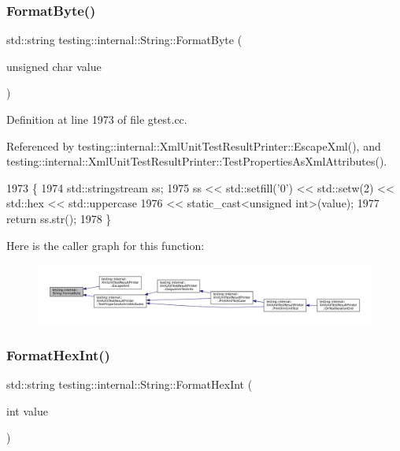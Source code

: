 \subsubsection{\texorpdfstring{Format\+Byte()}{FormatByte()}}
{\footnotesize\ttfamily std\+::string testing\+::internal\+::\+String\+::\+Format\+Byte (\begin{DoxyParamCaption}\item[{unsigned char}]{value }\end{DoxyParamCaption})\hspace{0.3cm}{\ttfamily [static]}}



Definition at line 1973 of file gtest.\+cc.



Referenced by testing\+::internal\+::\+Xml\+Unit\+Test\+Result\+Printer\+::\+Escape\+Xml(), and testing\+::internal\+::\+Xml\+Unit\+Test\+Result\+Printer\+::\+Test\+Properties\+As\+Xml\+Attributes().


\begin{DoxyCode}
1973                                                 \{
1974   std::stringstream ss;
1975   ss << std::setfill(\textcolor{charliteral}{'0'}) << std::setw(2) << std::hex << std::uppercase
1976      << \textcolor{keyword}{static\_cast<}\textcolor{keywordtype}{unsigned} \textcolor{keywordtype}{int}\textcolor{keyword}{>}(value);
1977   \textcolor{keywordflow}{return} ss.str();
1978 \}
\end{DoxyCode}
Here is the caller graph for this function\+:
\nopagebreak
\begin{figure}[H]
\begin{center}
\leavevmode
\includegraphics[width=350pt]{classtesting_1_1internal_1_1String_af702dc7cbd569589d8e3ff215a7cafa9_icgraph}
\end{center}
\end{figure}
\mbox{\label{classtesting_1_1internal_1_1String_affe59102e49092fc0684388e9b0c5c1e}} 
\subsubsection{\texorpdfstring{Format\+Hex\+Int()}{FormatHexInt()}}
{\footnotesize\ttfamily std\+::string testing\+::internal\+::\+String\+::\+Format\+Hex\+Int (\begin{DoxyParamCaption}\item[{int}]{value }\end{DoxyParamCaption})\hspace{0.3cm}{\ttfamily [static]}}




